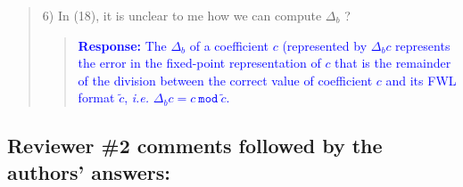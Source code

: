 \documentclass[11pt]{article}
\begin{document}
\begin{quote}
6) In (18), it is unclear to me how we can compute  $\Delta_b$ ?
\begin{quote}
\textcolor{blue}{\textbf{Response:} The $\Delta_{b}$ of a coefficient $c$ (represented by $\Delta_{b}c$ represents the error in the fixed-point representation of $c$ that is the remainder of the division between the correct value of coefficient $c$ and its FWL format $\tilde{c}$, {\it i.e.} $\Delta_{b}c=c~ \texttt{mod}~\tilde{c}$.}
\end{quote}


\end{quote}


\newpage

\subsection*{Reviewer \#2 comments followed by the authors' answers:}
\end{document}
